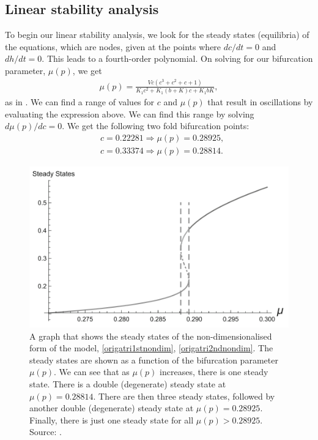 \subsection{Linear stability analysis}
To begin our linear stability analysis, we look for the steady states (equilibria) of the equations, {which are nodes}, given at the points where $dc/dt=0$ and $dh/dt=0$. This leads to a fourth-order polynomial. On solving for our bifurcation parameter, $\mu(p)$, we get
\begin{align}
    \mu(p)=\frac{Vc(c^3+c^2+c+1)}{K_1c^2+K_1(b+K)c+K_1bK},\nonumber
\end{align}
as in . We can find a range of values for $c$ and $\mu(p)$ that result in oscillations by evaluating the expression above. We can find this range by solving ${d\mu (p)}/{dc}=0$. We get the following { two fold bifurcation points}:
\begin{align}
    &c=0.22281 \Rightarrow \mu(p)=0.28925,\nonumber\\
    &c=0.33374 \Rightarrow \mu(p)=0.28814.\nonumber
\end{align}
\begin{figure}[h!!!t!!!b!!!p]
  \centering
  \includegraphics[width=0.8\linewidth]{Chapters/2_Ca2+_Models/extras/kaouristeadystates.PNG}
  \caption{A graph that shows the steady states of the non-dimensionalised form of the model, \eqref{origatri1stnondim}, \eqref{origatri2ndnondim}. The steady states are shown as a function of the bifurcation parameter $\mu(p)$. We can see that as $\mu(p)$ increases, there is one steady state. There is a double (degenerate) steady state at $\mu(p)=0.28814$. There are then three steady states, followed by another double (degenerate) steady state at $\mu(p)=0.28925$. Finally, there is just one steady state for all $\mu(p)>0.28925$. Source: .}
\end{figure}

